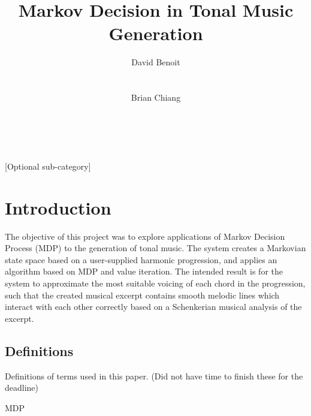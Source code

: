 \documentclass{chi2009}
\begin{document}
\setlength{\paperheight}{11in}
\setlength{\paperwidth}{8.5in}
\setlength{\pdfpageheight}{\paperheight}
\setlength{\pdfpagewidth}{\paperwidth}


\title{Markov Decision in Tonal Music Generation}
\author{
  \alignauthor David Benoit\\
    \\
    \\
  \alignauthor Brian Chiang\\
    \\
    \\
}

\maketitle


[Optional sub-category]

\section{Introduction}

	The objective of this project was to explore applications of Markov Decision Process (MDP) to the generation of tonal music.  The system creates a Markovian state space based on a user-supplied harmonic progression, and applies an algorithm based on MDP and value iteration.  The intended result is for the system to approximate the most suitable voicing of each chord in the progression, such that the created musical excerpt contains smooth melodic lines which interact with each other correctly based on a Schenkerian musical analysis of the excerpt.

\subsection{Definitions}
Definitions of terms used in this paper.
(Did not have time to finish these for the deadline)

MDP
\end{document}
